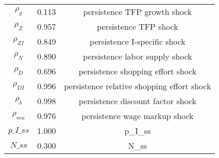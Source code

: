 \begin{center}
\begin{longtable}{ccc}
${\rho_g}$ 	 & 	 0.113 	 & 	 persistence TFP growth shock\\
${\rho_Z}$ 	 & 	 0.957 	 & 	 persistence TFP shock\\
${\rho_{ZI}}$ 	 & 	 0.849 	 & 	 persistence I-specific shock\\
${\rho_N}$ 	 & 	 0.890 	 & 	 persistence labor supply shock\\
${\rho_D}$ 	 & 	 0.696 	 & 	 persistence shopping effort shock\\
${\rho_{DI}}$ 	 & 	 0.996 	 & 	 persistence relative shopping effort shock\\
${\rho_b}$ 	 & 	 0.998 	 & 	 persistence discount factor shock\\
${\rho_{mu}}$ 	 & 	 0.976 	 & 	 persistence wage markup shock\\
$p\_I\_ss$ 	 & 	 1.000 	 & 	 p\_I\_ss\\
$N\_ss$ 	 & 	 0.300 	 & 	 N\_ss\\
\bottomrule%
\end{longtable}
\end{center}
